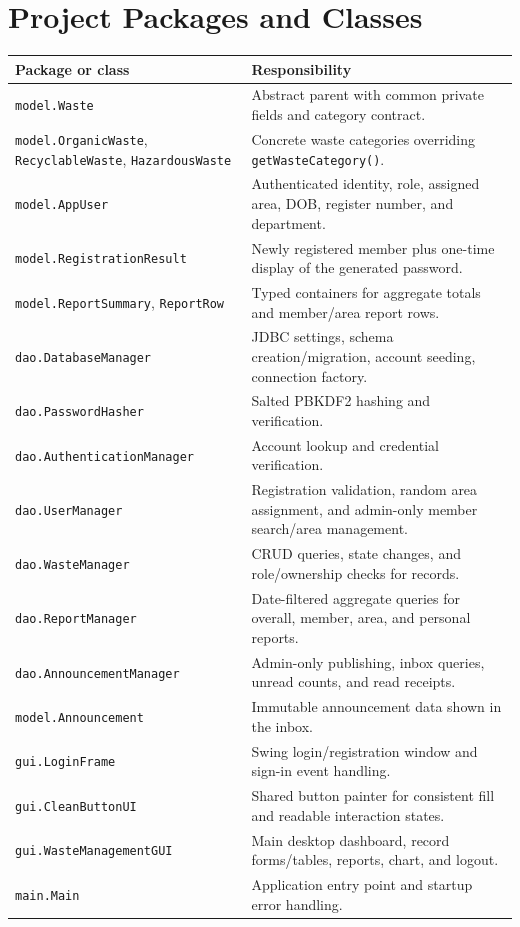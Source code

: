 \documentclass[12pt,a4paper]{report}
\begin{document}
\section{Project Packages and Classes}
\begin{longtable}{p{}p{}}
\toprule
\textbf{Package or class} & \textbf{Responsibility}\\
\midrule
\endhead
\texttt{model.Waste} & Abstract parent with common private fields and category contract.\\
\texttt{model.OrganicWaste}, \texttt{RecyclableWaste}, \texttt{HazardousWaste} & Concrete waste categories overriding \texttt{getWasteCategory()}.\\
\texttt{model.AppUser} & Authenticated identity, role, assigned area, DOB, register number, and department.\\
\texttt{model.RegistrationResult} & Newly registered member plus one-time display of the generated password.\\
\texttt{model.ReportSummary}, \texttt{ReportRow} & Typed containers for aggregate totals and member/area report rows.\\
\texttt{dao.DatabaseManager} & JDBC settings, schema creation/migration, account seeding, connection factory.\\
\texttt{dao.PasswordHasher} & Salted PBKDF2 hashing and verification.\\
\texttt{dao.AuthenticationManager} & Account lookup and credential verification.\\
\texttt{dao.UserManager} & Registration validation, random area assignment, and admin-only member search/area management.\\
\texttt{dao.WasteManager} & CRUD queries, state changes, and role/ownership checks for records.\\
\texttt{dao.ReportManager} & Date-filtered aggregate queries for overall, member, area, and personal reports.\\
\texttt{dao.AnnouncementManager} & Admin-only publishing, inbox queries, unread counts, and read receipts.\\
\texttt{model.Announcement} & Immutable announcement data shown in the inbox.\\
\texttt{gui.LoginFrame} & Swing login/registration window and sign-in event handling.\\
\texttt{gui.CleanButtonUI} & Shared button painter for consistent fill and readable interaction states.\\
\texttt{gui.WasteManagementGUI} & Main desktop dashboard, record forms/tables, reports, chart, and logout.\\
\texttt{main.Main} & Application entry point and startup error handling.\\
\bottomrule
\end{longtable}
\end{document}
